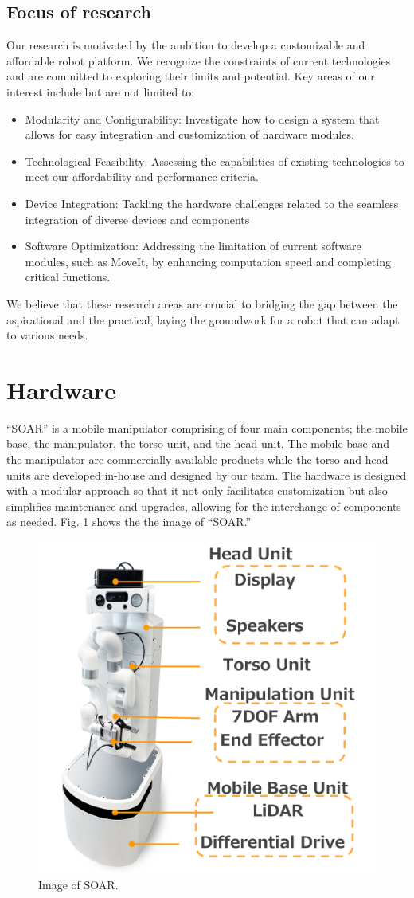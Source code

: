 \documentclass[runningheads,a4paper]{llncs}
\begin{document}
\subsection{Focus of research}
Our research is motivated by the ambition to develop a customizable and affordable robot platform.
We recognize the constraints of current technologies and are committed to exploring their limits and potential. Key areas of our interest include but are not limited to:
\begin{itemize}
	\item Modularity and Configurability: Investigate how to design a system that allows for easy integration and customization of hardware modules.
	\item Technological Feasibility: Assessing the capabilities of existing technologies to meet our affordability and performance criteria.
	\item Device Integration: Tackling the hardware challenges related to the seamless integration of diverse devices and components
	\item Software Optimization: Addressing the limitation of current software modules, such as MoveIt, by enhancing computation speed and completing critical functions.
\end{itemize}
We believe that these research areas are crucial to bridging the gap between the aspirational and the practical, laying the groundwork for a robot that can adapt to various needs.

\section{Hardware}
“SOAR” is a mobile manipulator comprising of four main components; the mobile base, the manipulator, the torso unit, and the head unit.
The mobile base and the manipulator are commercially available products while the torso and head units are developed in-house and designed by our team.
The hardware is designed with a modular approach so that it not only facilitates customization but also simplifies maintenance and upgrades, allowing for the interchange of components as needed.
Fig. \ref{fig:soar_overview} shows the the image of “SOAR.”

\begin{figure}[tbp]
	\centering
	\includegraphics[width=0.5\linewidth]{images/soar_overview.png}
	\caption{Image of SOAR.}
	\label{fig:soar_overview}
\end{figure}
\end{document}
